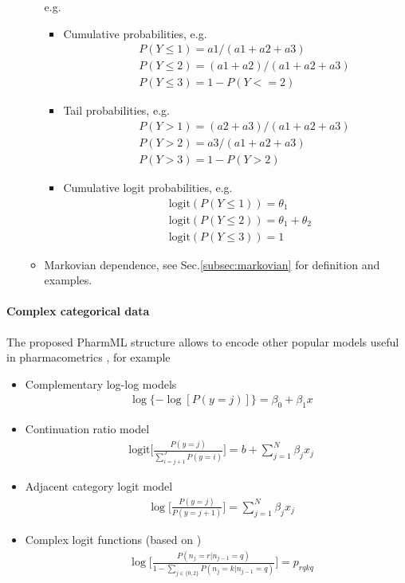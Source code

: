 \begin{itemize}
\begin{itemize}
e.g. 
\begin{itemize}
\item
Cumulative probabilities, e.g. 
\begin{eqnarray}
&&P(Y\leq1)=a1/(a1+a2+a3) \nonumber \\
&&P(Y\leq2)=(a1+a2)/(a1+a2+a3) \nonumber \\
&&P(Y\leq3)=1-P(Y<=2) \nonumber
\end{eqnarray}
\item
Tail probabilities, e.g. 
\begin{eqnarray}
&& P(Y>1)=(a2+a3)/(a1+a2+a3) \nonumber \\
&& P(Y>2)=a3/(a1+a2+a3)  \nonumber \\ 
&& P(Y>3)=1-P(Y>2) \nonumber
\end{eqnarray}
\item
Cumulative logit probabilities, e.g. 
\begin{align}
& \text{logit}(P(Y\leq1))= \theta_1  \nonumber \\
& \text{logit}(P(Y\leq2))= \theta_1+\theta_2  \nonumber \\
& \text{logit}(P(Y\leq3))=1  \nonumber
\end{align}
\end{itemize}
\item
Markovian dependence, see Sec.\ref{subsec:markovian} for definition and examples.
\end{itemize}
\end{itemize}

\paragraph{Complex categorical data} The proposed PharmML structure allows to encode 
other popular models useful in pharmacometrics \cite{Dobson:2002uq}, for example
\begin{itemize}
\item
Complementary log-log models
\begin{align}
& \log\{-\log[P(y=j)]\} = \beta_0 + \beta_1 x \nonumber
\end{align}
\item
Continuation ratio model
\begin{align}
& \text{logit}\Big[\frac{P(y=j) }{ \sum_{i =j+1}^{J} P(y=i) } \Big] = b + \sum_{j = 1}^{N} \beta_j x_j \nonumber
\end{align}
\item
Adjacent category logit model
\begin{align}
& \log\Big[\frac{P(y=j) }{ P(y=j+1) } \Big] = \sum_{j = 1}^{N} \beta_j x_j \nonumber
\end{align}
\item
Complex logit functions (based on \cite{Girard:1998fk})
\begin{align}
& \log \Big[\frac{P(n_j=r | n_{j-1}=q) }{ 1 - \sum_{j\in \{0,2\}} P(n_j=k | n_{j-1} = q)} \Big] = p_{rqkq} \nonumber
\end{align}
\end{itemize}


